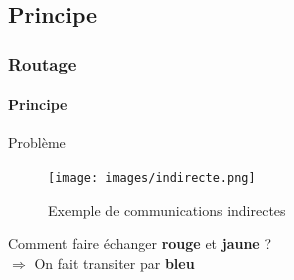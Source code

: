 \documentclass{beamer}
\begin{document}
    \subsection{Principe}
    \begin{frame}
      \frametitle{Routage}
      \framesubtitle{Principe}
      \begin{block}{Problème}
        \begin{figure}
          \begin{center}
            \texttt{[image: images/indirecte.png]}
            \caption{Exemple de communications indirectes}
            \label{fig:indirecte}
          \end{center}
        \end{figure}
        \begin{center}
          Comment faire échanger \textbf{rouge} et \textbf{jaune} ?\\
          $ \Rightarrow $ On fait transiter par \textbf{bleu}
        \end{center}
      \end{block}
    \end{frame}
\end{document}
